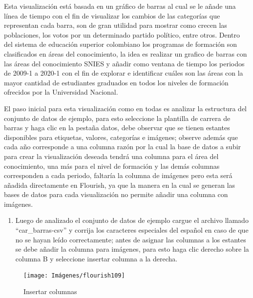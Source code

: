 \documentclass[
]{book}
\providecommand{\tightlist}{%
  \setlength{\itemsep}{0pt}\setlength{\parskip}{0pt}}
\begin{document}
Esta visualización está basada en un gráfico de barras al cual se le añade una línea de tiempo con el fin de visualizar los cambios de las categorías que representan cada barra, son de gran utilidad para mostrar como crecen las poblaciones, los votos por un determinado partido político, entre otros. Dentro del sistema de educación superior colombiano los programas de formación son clasificados en áreas del conocimiento, la idea es realizar un grafico de barras con las áreas del conocimiento SNIES y añadir como ventana de tiempo los periodos de 2009-1 a 2020-1 con el fin de explorar e identificar cuáles son las áreas con la mayor cantidad de estudiantes graduados en todos los niveles de formación ofrecidos por la Universidad Nacional.

El paso inicial para esta visualización como en todas es analizar la estructura del conjunto de datos de ejemplo, para esto seleccione la plantilla de carrera de barras y haga clic en la pestaña datos, debe observar que se tienen estantes disponibles para etiquetas, valores, categorías e imágenes; observe además que cada año corresponde a una columna razón por la cual la base de datos a subir para crear la visualización deseada tendrá una columna para el área del conocimiento, una más para el nivel de formación y las demás columnas corresponden a cada periodo, faltaría la columna de imágenes pero esta será añadida directamente en Flourish, ya que la manera en la cual se generan las bases de datos para cada visualización no permite añadir una columna con imágenes.

\begin{enumerate}
\def\labelenumi{\arabic{enumi}.}
\tightlist
\item
  Luego de analizado el conjunto de datos de ejemplo cargue el archivo llamado ``car\_barras-csv'' y corrija los caracteres especiales del español en caso de que no se hayan leído correctamente; antes de asignar las columnas a los estantes se debe añadir la columna para imágenes, para esto haga clic derecho sobre la columna B y seleccione insertar columna a la derecha.
\end{enumerate}

\begin{figure}

{\centering \texttt{[image: Imágenes/flourish109]} 

}

\caption{Insertar columnas}\label{fig:paso1carrerabarrasflourish-fig}
\end{figure}
\end{document}
